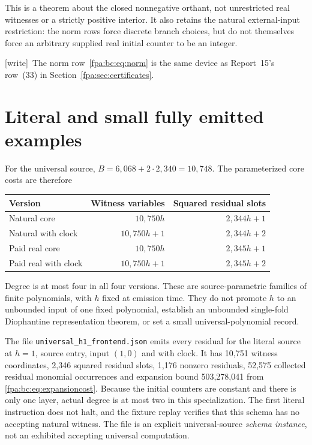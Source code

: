 \documentclass[11pt,a4paper]{article}
\numberwithin{equation}{section}
\newcommand{\wtag}{\textup{[write]}}
\begin{document}
This is a theorem about the closed nonnegative orthant, not unrestricted real
witnesses or a strictly positive interior. It also retains the natural
external-input restriction: the norm rows force discrete branch choices,
but do not themselves force an arbitrary supplied real initial counter to be
an integer.

\wtag\ The norm row~\eqref{fpa:bc:eq:norm} is the same device as Report~15's row~(33) in Section~\ref{fpa:sec:certificates}.

\section{Literal and small fully emitted examples}\label{fpa:bc:sec:examples}
For the universal source, $B=6,068+2\cdot2,340=10,748$. The parameterized
core costs are therefore
\begin{center}
\begin{tabular}{lrr}
\toprule
Version&Witness variables&Squared residual slots\\
\midrule
Natural core&$10,750h$&$2,344h+1$\\
Natural with clock&$10,750h+1$&$2,344h+2$\\
Paid real core&$10,750h$&$2,345h+1$\\
Paid real with clock&$10,750h+1$&$2,345h+2$\\
\bottomrule
\end{tabular}
\end{center}
Degree is at most four in all four versions. These are source-parametric
families of finite polynomials, with $h$ fixed at emission time. They do not
promote $h$ to an unbounded input of one fixed polynomial, establish an
unbounded single-fold Diophantine representation theorem, or set a small
universal-polynomial record.

The file \texttt{universal\_h1\_frontend.json} emits every residual for the
literal source at $h=1$, source entry, input $(1,0)$ and with clock. It has
10,751 witness coordinates, 2,346 squared residual slots, 1,176 nonzero
residuals, 52,575 collected residual monomial occurrences and expansion bound
503,278,041 from \eqref{fpa:bc:eq:expansioncost}. Because the initial counters are
constant and there is only one layer, actual degree is at most two in this
specialization. The first literal instruction does not halt, and the fixture
replay verifies that this schema has no accepting natural witness. The file
is an explicit universal-source \emph{schema instance}, not an exhibited
accepting universal computation.
\end{document}
